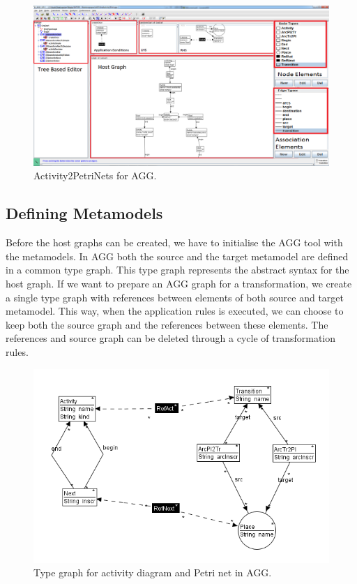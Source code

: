 \documentclass[pdftex,11pt,a4paper]{article}
\begin{document}
\begin{figure}[H]
	\centering
	\includegraphics[scale=0.29]{figures/AGGscreen.png}
	\caption{Activity2PetriNets for AGG.}
	\label{fig:AGGScreen}
\end{figure}

\subsection{Defining Metamodels}

\noindent Before the host graphs can be created, we have to initialise the AGG
tool with the metamodels. In AGG both the source and the target metamodel are
defined in a common type graph. This type graph represents the abstract syntax
for the host graph. If we want to prepare an AGG graph for a transformation, we
create a single type graph with references between elements of both source and
target metamodel. This way, when the application rules is executed, we can
choose to keep both the source graph and the references between these elements.
The references and source graph can be deleted through a cycle of transformation rules.

\begin{figure}[H]
	\centering
	\includegraphics[scale=0.7]{figures/AggTypeGraph.png}
	\caption{Type graph for activity diagram and Petri net in AGG.}
	\label{fig:AggTypeGraph}
\end{figure}
\end{document}
